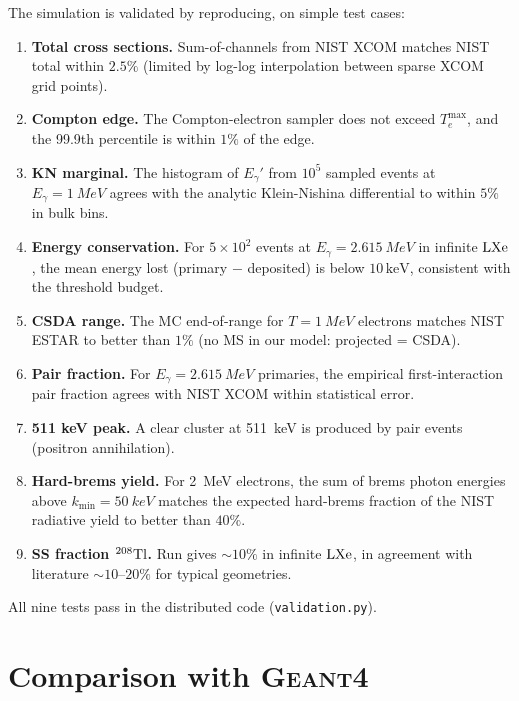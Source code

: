 \documentclass[11pt,a4paper]{article}
\newcommand{\Eg}{E_\gamma}
\newcommand{\Egp}{E_\gamma'}
\newcommand{\kmin}{k_{\min}}
\begin{document}
The simulation is validated by reproducing, on simple test cases:

\begin{enumerate}\itemsep=0pt
  \item \textbf{Total cross sections.} Sum-of-channels from NIST
        XCOM matches NIST total within $2.5\%$ (limited by log-log
        interpolation between sparse XCOM grid points).
  \item \textbf{Compton edge.} The Compton-electron sampler does
        not exceed $T_e^{\max}$, and the 99.9th percentile is
        within $1\%$ of the edge.
  \item \textbf{KN marginal.} The histogram of $\Egp$ from $10^5$
        sampled events at $\Eg=\SI{1}{MeV}$ agrees with the
        analytic Klein-Nishina differential to within $5\%$ in
        bulk bins.
  \item \textbf{Energy conservation.} For $5\times 10^2$ events at
        $\Eg=\SI{2.615}{MeV}$ in infinite $\rm LXe$, the mean
        energy lost (primary $-$ deposited) is below $10\,\text{keV}$,
        consistent with the threshold budget.
  \item \textbf{CSDA range.} The MC end-of-range for $T=\SI{1}{MeV}$
        electrons matches NIST ESTAR to better than $1\%$
        (no MS in our model: projected = CSDA).
  \item \textbf{Pair fraction.} For $\Eg=\SI{2.615}{MeV}$ primaries,
        the empirical first-interaction pair fraction agrees with
        NIST XCOM within statistical error.
  \item \textbf{511 keV peak.} A clear cluster at \SI{511}{keV} is
        produced by pair events (positron annihilation).
  \item \textbf{Hard-brems yield.} For \SI{2}{MeV} electrons, the
        sum of brems photon energies above $\kmin=\SI{50}{keV}$
        matches the expected hard-brems fraction of the NIST
        radiative yield to better than $40\%$.
  \item \textbf{SS fraction $\rm{}^{208}Tl$.} Run gives $\sim 10\%$
        in infinite $\rm LXe$, in agreement with literature
        $\sim 10$--$20\%$ for typical geometries.
\end{enumerate}

All nine tests pass in the distributed code (\verb|validation.py|).

\section{Comparison with \textsc{Geant4}}\label{sec:g4}
\end{document}

